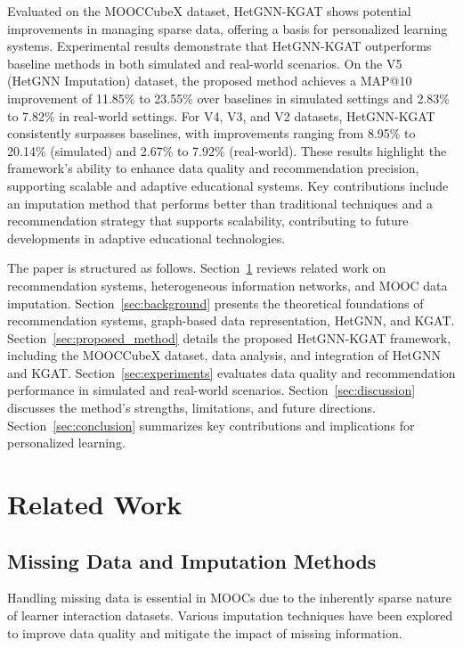\documentclass{ieeeaccess}
\begin{document}
Evaluated on the MOOCCubeX dataset, HetGNN-KGAT shows potential improvements in managing sparse data, offering a basis for personalized learning systems. Experimental results demonstrate that HetGNN-KGAT outperforms baseline methods in both simulated and real-world scenarios. On the V5 (HetGNN Imputation) dataset, the proposed method achieves a MAP@10 improvement of 11.85\% to 23.55\% over baselines in simulated settings and 2.83\% to 7.82\% in real-world settings. For V4, V3, and V2 datasets, HetGNN-KGAT consistently surpasses baselines, with improvements ranging from 8.95\% to 20.14\% (simulated) and 2.67\% to 7.92\% (real-world). These results highlight the framework’s ability to enhance data quality and recommendation precision, supporting scalable and adaptive educational systems. Key contributions include an imputation method that performs better than traditional techniques and a recommendation strategy that supports scalability, contributing to future developments in adaptive educational technologies.


The paper is structured as follows. Section~\ref{sec:related_work} reviews related work on recommendation systems, heterogeneous information networks, and MOOC data imputation. Section~\ref{sec:background} presents the theoretical foundations of recommendation systems, graph-based data representation, HetGNN, and KGAT. Section~\ref{sec:proposed_method} details the proposed HetGNN-KGAT framework, including the MOOCCubeX dataset, data analysis, and integration of HetGNN and KGAT. Section~\ref{sec:experiments} evaluates data quality and recommendation performance in simulated and real-world scenarios. Section~\ref{sec:discussion} discusses the method's strengths, limitations, and future directions. Section~\ref{sec:conclusion} summarizes key contributions and implications for personalized learning.

\section{Related Work}
\label{sec:related_work}



\subsection{Missing Data and Imputation Methods}

Handling missing data is essential in MOOCs due to the inherently sparse nature of learner interaction datasets. Various imputation techniques have been explored to improve data quality and mitigate the impact of missing information.
\end{document}
